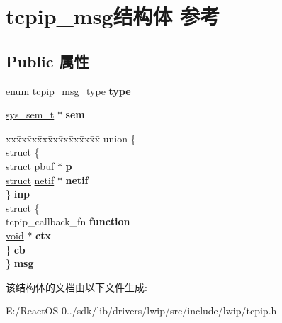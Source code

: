 \hypertarget{structtcpip__msg}{}\section{tcpip\+\_\+msg结构体 参考}
\label{structtcpip__msg}
\subsection*{Public 属性}
\begin{DoxyCompactItemize}
\item 
\mbox{\label{structtcpip__msg_a5b992b509c516199c800c913993574c1}} 
\hyperlink{interfaceenum}{enum} tcpip\+\_\+msg\+\_\+type {\bfseries type}
\item 
\mbox{\label{structtcpip__msg_a68b745804255e3b227ec2f5ef0f8e136}} 
\hyperlink{struct__sys__sem__t}{sys\+\_\+sem\+\_\+t} $\ast$ {\bfseries sem}
\item 
\mbox{\label{structtcpip__msg_a359112f6e62a4735a26e41596e7da914}} 
\begin{tabbing}
xx\=xx\=xx\=xx\=xx\=xx\=xx\=xx\=xx\=\kill
union \{\\
\>struct \{\\
\>\>\hyperlink{interfacestruct}{struct} \hyperlink{structpbuf}{pbuf} $\ast$ {\bfseries p}\\
\>\>\hyperlink{interfacestruct}{struct} \hyperlink{structnetif}{netif} $\ast$ {\bfseries netif}\\
\>\} {\bfseries inp}\\
\>struct \{\\
\>\>tcpip\_callback\_fn {\bfseries function}\\
\>\>\hyperlink{interfacevoid}{void} $\ast$ {\bfseries ctx}\\
\>\} {\bfseries cb}\\
\} {\bfseries msg}\\

\end{tabbing}\end{DoxyCompactItemize}


该结构体的文档由以下文件生成\+:\begin{DoxyCompactItemize}
\item 
E\+:/\+React\+O\+S-\/0../sdk/lib/drivers/lwip/src/include/lwip/tcpip.\+h\end{DoxyCompactItemize}
